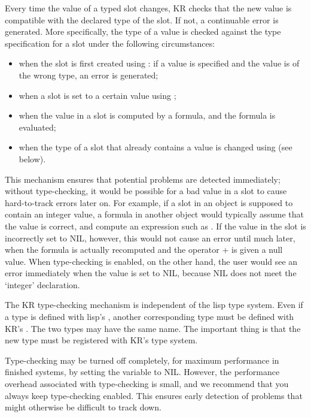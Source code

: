 Every time the value of a typed slot changes, KR checks that the new
value is compatible with the declared type of the slot.  If not, a
continuable error is generated.  More specifically, the type of a
value is checked against the type specification for a slot under the
following circumstances:
\begin{itemize}
\item when the slot is first created using : if a value
is specified and the value is of the wrong type, an error is
generated;

\item when a slot is set to a certain value using ;

\item when the value in a slot is computed by a formula, and the formula is
evaluated;

\item when the type of a slot that already contains a value is changed using
 (see below).
\end{itemize}

This mechanism ensures that potential problems are detected
immediately; without type-checking, it would be possible for a bad
value in a slot to cause hard-to-track errors later on.  For example,
if a slot in an object is supposed to contain an integer value, a
formula in another object would typically assume that the value is
correct, and compute an expression such as .
If the value in the slot  is incorrectly set to NIL, however,
this would not cause an error until much later, when the formula is
actually recomputed and the operator + is given a null value.  When
type-checking is enabled, on the other hand, the user would see an
error immediately when the value is set to NIL, because NIL does not
meet the `integer' declaration.

The KR type-checking mechanism is independent of the lisp type system.
Even if a type is defined with lisp's , another corresponding
type must be defined with KR's .  The two types may have the
same name.  The important thing is that the new type must be registered with
KR's type system.

Type-checking may be turned off completely, for maximum performance in
finished systems, by setting the variable  to
NIL.  However, the performance overhead associated with type-checking
is small, and we recommend that you always keep type-checking enabled.
This ensures early detection of problems that might otherwise be
difficult to track down.


